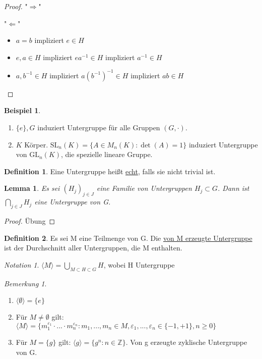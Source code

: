 \documentclass[12pt]{scrartcl}%
\newtheorem{lemma}{Lemma}
\theoremstyle{definition}
\newtheorem*{defn}{Definition}
\newtheorem{ex}{Beispiel}
\theoremstyle{remark}
\newtheorem*{notation}{Notation}
\newtheorem*{nb}{Bemerkung}
\newcommand{\gl}{\text{GL}}
\newcommand{\inv}[1]{\left(#1\right)^{-1}}
\newcommand{\Inv}[1]{#1^{-1}}
\begin{document}
\begin{proof}
    "$\Rightarrow$" \checkmark

    "$\Leftarrow$" 

    \begin{itemize} 
        \item $a=b$ impliziert $e\in H$
        \item $e,a\in H$ impliziert $e\Inv a\in H$ impliziert $\Inv a \in H$
        \item $a,\Inv b\in H$ impliziert $a\inv{\Inv b} \in H$ impliziert $ab\in H$
    \end{itemize}
\end{proof}

\begin{ex}
    \begin{enumerate}[label=(\alph*)]
        \item $\{e\}, G$ induziert Untergruppe für alle Gruppen $(G,\cdot)$.
        \item $K$ Körper. $\text{SL}_n(K)=\{A\in M_n(K): \det(A)=1\}$ induziert Untergruppe von $\gl_n(K)$, die spezielle lineare Gruppe.
    \end{enumerate}
\end{ex}

\begin{defn}
    Eine Untergruppe heißt \underline{echt}, falls sie nicht trivial ist.
\end{defn}

\begin{lemma}
	Es sei $(H_{j})_{j \in J}$ eine Familie von Untergruppen $H_{j} \subset G$. Dann ist $\bigcap_{j 		\in J}H_{j}$ eine Untergruppe von G.
\end{lemma}

\begin{proof}
	Übung
\end{proof}

\begin{defn}
	Es sei M eine Teilmenge von G. Die \underline{von M erzeugte Untergruppe} ist der Durchschnitt 	aller Untergruppen, die M enthalten.
\end{defn}

\begin{notation}
	$\langle M \rangle =\bigcup_{M \subset H \subset G}H$, wobei H Untergruppe
\end{notation}

\begin{nb}
	\begin{enumerate}[label=(\alph*)]
		\item $\langle \emptyset \rangle = \lbrace e \rbrace$
		\item Für $M \neq \emptyset$ gilt: $\langle M \rangle = \lbrace m_{1}^{\varepsilon_{1}} \cdot ... \cdot m_{n}^{\varepsilon_{n}} : m_{1},...,m_{n} \in M, \varepsilon_{1},...,\varepsilon_{n} \in \lbrace -1,+1\rbrace, n \geq 0 \rbrace$
		\item Für $M = \lbrace g \rbrace$ gilt: $\langle g \rangle = \lbrace g^{n} : n \in \mathbb{Z} \rbrace$. Von g erzeugte zyklische Untergruppe von G.
	\end{enumerate}
\end{nb}
\end{document}
